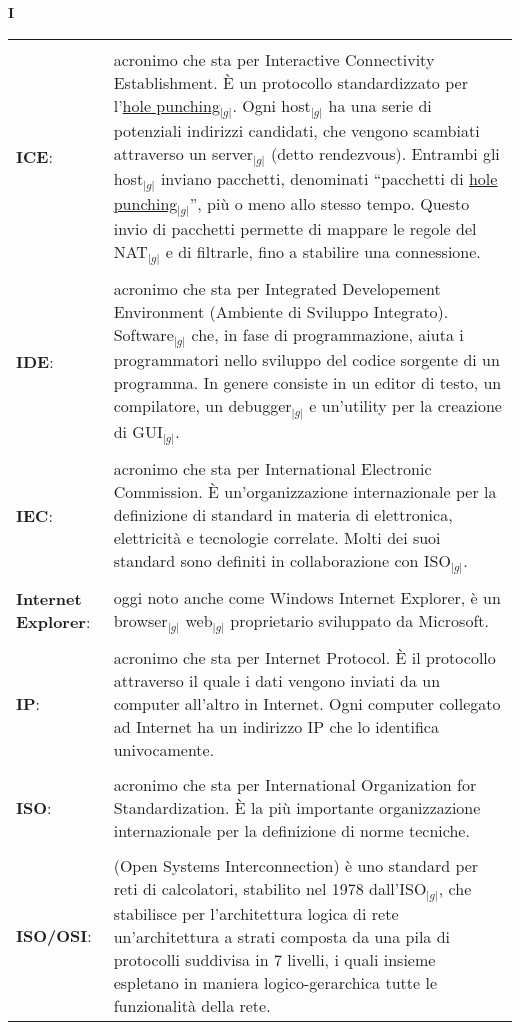 \newpage


\hfill\Huge{\textbf{I}}\\
\normalsize
\label{tabVers}
	\begin{longtable}{p{} p{}} 
	    \toprule
	    \\
	    \textbf{ICE}: 			&	acronimo che sta per Interactive Connectivity Establishment. \`E un protocollo standardizzato per l’\underline{hole punching}$_{|g|}$. Ogni host$_{|g|}$ ha una serie di potenziali indirizzi candidati, che vengono scambiati attraverso un 
							server$_{|g|}$ (detto rendezvous). Entrambi gli host$_{|g|}$ inviano pacchetti, denominati “pacchetti di \underline{hole punching}$_{|g|}$”, più o meno allo stesso tempo. Questo invio di pacchetti permette di mappare le regole del NAT$_{|g|}$ e di filtrarle, 
							fino a stabilire una connessione.\\
	    \\
	    \textbf{IDE}: 			&	acronimo che sta per Integrated Developement Environment (Ambiente di Sviluppo Integrato). Software$_{|g|}$ che, in fase di programmazione, aiuta i programmatori nello sviluppo del codice sorgente di un programma. 
							In genere consiste in un editor di testo, un compilatore, un debugger$_{|g|}$ e un’utility per la creazione di GUI$_{|g|}$.\\
	    \\
	    \textbf{IEC}:			&	acronimo che sta per International Electronic Commission. \`E un’organizzazione internazionale per la definizione di standard in materia di elettronica, elettricità e tecnologie correlate. 
							Molti dei suoi standard sono definiti in collaborazione con ISO$_{|g|}$.\\
	    \\
	    \textbf{Internet Explorer}:		&	oggi noto anche come Windows Internet Explorer, è un browser$_{|g|}$ web$_{|g|}$ proprietario sviluppato da Microsoft.\\
	    \\
	    \textbf{IP}:			&	acronimo che sta per Internet Protocol. \`E il protocollo attraverso il quale i dati vengono inviati da un computer all’altro in Internet.
							Ogni computer collegato ad Internet ha un indirizzo IP che lo identifica univocamente.\\
	    \\
	    \textbf{ISO}:			&	acronimo che sta per International Organization for Standardization. \`E la più importante organizzazione internazionale per la definizione di norme tecniche.\\
	    \\
	    \textbf{ISO/OSI}: 			&	(Open Systems Interconnection) è uno standard per reti di calcolatori, stabilito nel 1978 dall'ISO$_{|g|}$, che stabilisce per l'architettura logica di rete un'architettura a strati composta da una pila di protocolli suddivisa in 7 livelli, 
							i quali insieme espletano in maniera logico-gerarchica tutte le funzionalità della rete.
	\end{longtable}
\newpage

